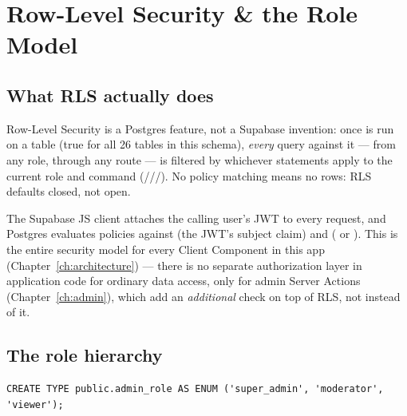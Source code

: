 \chapter{Row-Level Security \& the Role Model}
\label{ch:rls}

\section{What RLS actually does}

Row-Level Security is a Postgres feature, not a Supabase invention: once  is run on a table (true for all 26 tables in this schema), \emph{every} query against it — from any role, through any route — is filtered by whichever  statements apply to the current role and command (///). No policy matching means no rows: RLS defaults closed, not open.

The Supabase JS client attaches the calling user's JWT to every request, and Postgres evaluates policies against  (the JWT's subject claim) and  ( or ). This is the entire security model for every Client Component in this app (Chapter~\ref{ch:architecture}) — there is no separate authorization layer in application code for ordinary data access, only for admin Server Actions (Chapter~\ref{ch:admin}), which add an \emph{additional} check on top of RLS, not instead of it.

\section{The role hierarchy}

\begin{lstlisting}[style=olkcodesql, caption={The only enum in the schema}]
CREATE TYPE public.admin_role AS ENUM ('super_admin', 'moderator', 'viewer');
\end{lstlisting}

